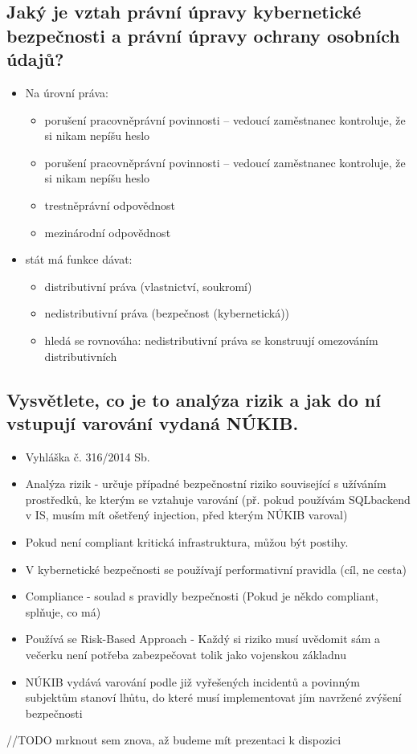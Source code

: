 \subsection{ Jaký je vztah právní úpravy kybernetické bezpečnosti a právní úpravy ochrany osobních údajů?}
\begin{itemize}
    \item Na úrovní práva:
          \begin{itemize}
              \item porušení pracovněprávní povinnosti – vedoucí zaměstnanec kontroluje, že si nikam nepíšu heslo
              \item  porušení pracovněprávní povinnosti – vedoucí zaměstnanec kontroluje, že si nikam nepíšu heslo
              \item trestněprávní odpovědnost
              \item mezinárodní odpovědnost
          \end{itemize}
    \item stát má funkce dávat:
          \begin{itemize}
              \item distributivní práva (vlastnictví, soukromí)
              \item nedistributivní práva (bezpečnost (kybernetická))
              \item hledá se rovnováha: nedistributivní práva se konstruují omezováním distributivních
          \end{itemize}
\end{itemize}


\subsection{Vysvětlete, co je to analýza rizik a jak do ní vstupují varování vydaná NÚKIB.}
\begin{itemize}
    \item Vyhláška č. 316/2014 Sb.
    \item Analýza rizik - určuje případné bezpečnostní riziko související s užíváním prostředků, ke kterým se vztahuje varování (př. pokud používám SQLbackend v IS, musím mít ošetřený injection, před kterým NÚKIB varoval)
    \item {} Pokud není compliant kritická infrastruktura, můžou být postihy.
    \item V kybernetické bezpečnosti se používají performativní pravidla (cíl, ne cesta)
    \item Compliance - soulad s pravidly bezpečnosti (Pokud je někdo compliant, splňuje, co má)
    \item Používá se Risk-Based Approach - Každý si riziko musí uvědomit sám a večerku není potřeba zabezpečovat tolik jako vojenskou základnu
    \item NÚKIB vydává varování podle již vyřešených incidentů a povinným subjektům stanoví lhůtu, do které musí implementovat jím navržené zvýšení bezpečnosti
\end{itemize}
//TODO mrknout sem znova, až budeme mít prezentaci k dispozici
